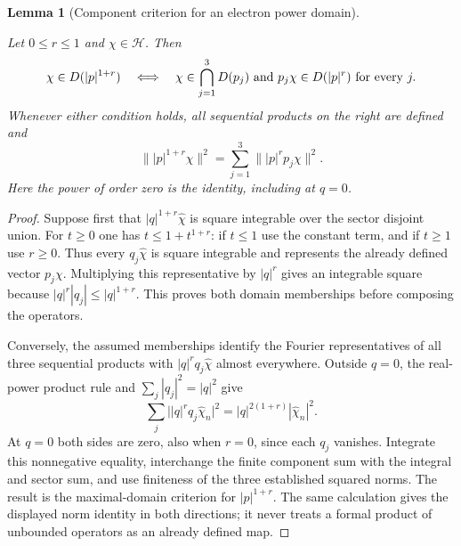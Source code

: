 \documentclass[11pt,a4paper]{article}
\newtheorem{lemma}[theorem]{Lemma}
\theoremstyle{definition}
\theoremstyle{remark}
\newcommand{\proofid}[1]{\par\smallskip{\normalfont\scriptsize\color{inkblue}Stable ID: \nolinkurl{#1}}\par\smallskip}
\begin{document}
\begin{lemma}[Component criterion for an electron power domain]
\label{reg:component-domain}
\proofid{reg:component-domain}
\par{}\par\smallskip

Let $0\leq r\leq1$ and $\chi\in\mathcal H$. Then
\[
 \chi\in D(|p|^{1+r})
 \quad\Longleftrightarrow\quad
 \chi\in\bigcap_{j=1}^3D(p_j)
 \ \hbox{and}\ p_j\chi\in D(|p|^r)\text{ for every }j.
\]
Whenever either condition holds, all sequential products on the right
are defined and
\[
 \||p|^{1+r}\chi\|^2
      =\sum_{j=1}^3\||p|^rp_j\chi\|^2.
\]
Here the power of order zero is the identity, including at $q=0$.
\end{lemma}
\begin{proof}
Suppose first that $|q|^{1+r}\widehat\chi$ is square integrable
over the sector disjoint union. For $t\geq0$ one has
$t\leq1+t^{1+r}$: if $t\leq1$ use the constant term, and
if $t\geq1$ use $r\geq0$. Thus every $q_j\widehat\chi$
is square integrable and represents the already defined vector
$p_j\chi$. Multiplying this representative by $|q|^r$ gives
an integrable square because
$|q|^r|q_j|\leq|q|^{1+r}$. This proves both domain
memberships before composing the operators.

Conversely, the assumed memberships identify the Fourier
representatives of all three sequential products with
$|q|^rq_j\widehat\chi$ almost everywhere. Outside $q=0$,
the real-power product rule and $\sum_j|q_j|^2=|q|^2$ give
\[
 \sum_j\bigl||q|^rq_j\widehat\chi_n\bigr|^2
       =|q|^{2(1+r)}|\widehat\chi_n|^2.
\]
At $q=0$ both sides are zero, also when $r=0$, since each
$q_j$ vanishes. Integrate this nonnegative equality, interchange
the finite component sum with the integral and sector sum, and
use finiteness of the three established squared norms. The result
is the maximal-domain criterion for $|p|^{1+r}$. The same
calculation gives the displayed norm identity in both directions;
it never treats a formal product of unbounded operators as an
already defined map.
\end{proof}
\end{document}
